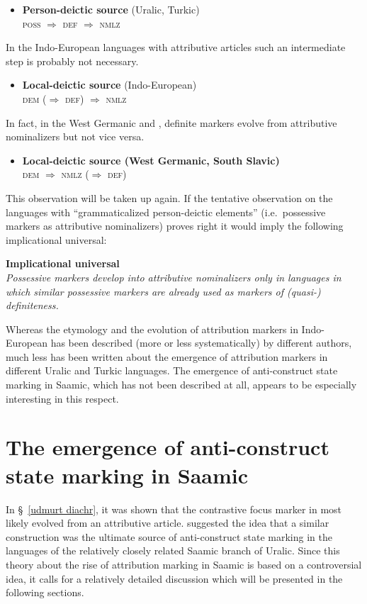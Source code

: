 {\begin{itemize}
\item \textbf{Person-deictic source} (Uralic, Turkic)\\
	\textsc{poss $\Rightarrow$ def $\Rightarrow$ nmlz}
\end{itemize}
In the Indo-European languages with attributive articles such an intermediate step is probably not necessary.
\begin{itemize}
\item \textbf{Local-deictic source} (Indo-European)\\
	\textsc{dem ($\Rightarrow$ def) $\Rightarrow$ nmlz}
\end{itemize}
In fact, in the West Germanic and , definite markers evolve from attributive nominalizers but not vice versa.
\begin{itemize}
\item \textbf{Local-deictic source (West Germanic, South Slavic)}\\
	\textsc{dem $\Rightarrow$ nmlz ($\Rightarrow$ def)}
\end{itemize}
This observation will be taken up again. If the tentative observation on the languages with “grammaticalized person-deictic elements” (i.e.~possessive markers as attributive nominalizers) proves right it would imply the following implicational universal:
\begin{exe}
\label{universal}
\ex \rm{\textbf{Implicational universal}}\\
	\textit{Possessive markers develop into attributive nominalizers only in languages in which similar possessive markers are already used as markers of (quasi-) definiteness.}
\end{exe}
Whereas the etymology and the evolution of attribution markers in Indo-European has been described (more or less systematically) by different authors, much less has been written about the emergence of attribution markers in different Uralic and Turkic languages. The emergence of anti\hyp{}construct state marking in Saamic, which has not been described at all, appears to be especially interesting in this respect.

\section[Anti\hyp{}construct state in Saamic]{The emergence of anti\hyp{}construct state marking in Saamic} \label{saamic diachr}
In \S~\ref{udmurt diachr}, it was shown that the contrastive focus marker in  most likely evolved from an attributive article. \cite{riesler2006b} suggested the idea that a similar construction was the ultimate source of anti\hyp{}construct state marking in the languages of the relatively closely related Saamic branch of Uralic. Since this theory about the rise of attribution marking in Saamic is based on a controversial idea, it calls for a relatively detailed discussion which will be presented in the following sections.

}
